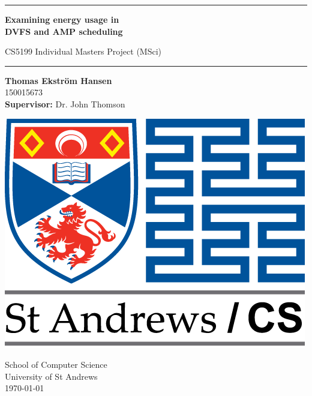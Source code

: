 \begin{titlepage}
    \begin{center}
        \vspace*{1cm}
        
        {\rule{0.9\textwidth}{0.5mm}}
        
        \Huge
        \textbf{Examining energy usage in\\ DVFS and AMP scheduling}
        
        \LARGE
        CS5199 Individual Masters Project (MSci)
        
        {\noindent \hspace*{-0.65cm} \rule[0.3cm]{1.08\textwidth}{0.5mm}}
        
        \vspace{1.5cm}
        
        \sffamily
        \Large
        \textbf{Thomas Ekstr{\" o}m Hansen}\\150015673
        \\
        \textbf{Supervisor:} Dr. John Thomson
        \Large
        \rmfamily
        
        \vfill
        
        \includegraphics[width=0.4\linewidth]{titlepage/logo-uni-cs-mintext-long.png}
        
        \vspace{1.5cm}
        
        School of Computer Science
        \\
        University of St Andrews
        \\
        \vspace{3mm}
        \today
    \end{center}
\end{titlepage}
